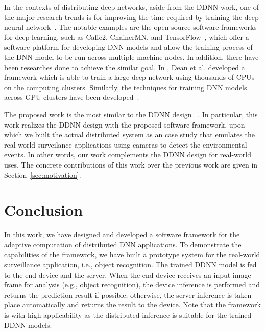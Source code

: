 \documentclass[conference]{IEEEtran}
\begin{document}
In the contexts of distributing deep networks, aside from the DDNN work, one of the major research trends is for improving the time required by training the deep neural network​​~\cite{tensorflow16,Caffe217,Chainer17,dean2012large,iandola2016firecaffe,dean2015large}. The notable examples are the open source software frameworks for deep learning, such as Caffe2, ChainerMN, and TensorFlow~\cite{tensorflow16,Caffe217,Chainer17,akiba2017chainermn}, which offer a software platform for developing DNN models and allow the training process of the DNN model to be run across multiple machine nodes. In addition, there have been researches done to achieve the similar goal. In \cite{dean2012large}, Dean et al. developed a framework which is able to train a large deep network using thousands of CPUs on the computing clusters. Similarly, the techniques for training DNN models across GPU clusters have been developed~\cite{iandola2016firecaffe,dean2015large}.

The proposed work is the most similar to the DDNN design~\cite{Teerapittayanon17} . ​In particular, this work realizes the DDNN design with the proposed software framework, upon which we built the actual distributed system as an case study that emulates the real-world surveilance applications using cameras to detect the environmental events. In other words, our work complements the DDNN design for real-world uses. The concrete contributions of this work over the previous work are given in Section~\ref{sec:motivation}.


\section{Conclusion}
\label{sec:conclusion}
In this work, we have designed and developed a software framework for the adaptive computation of distributed DNN applications. To demonstrate the capabilities of the framework, we have built a prototype system for the real-world surveillance application, i.e., object recognition. The trained DDNN model is fed to the end device and the server. When the end device receives an input image frame for analysis (e.g., object recognition), the device inference is performed and returns the prediction result if possible; otherwise, the server inference is taken place automatically and returns the result to the device. Note that the framework is with high applicability as the distributed inference is suitable for the trained DDNN models.
\end{document}
